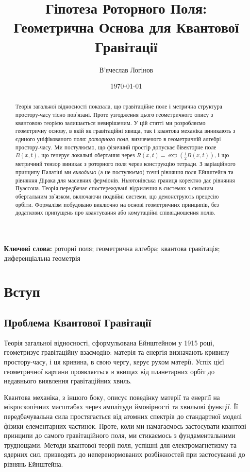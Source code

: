 \documentclass[11pt,a4paper]{article}
\title{Гіпотеза Роторного Поля: Геометрична Основа для Квантової Гравітації}
\author[1]{В'ячеслав Логінов}
\affil[1]{Київ, Україна\\ \texttt{barthez.slavik@gmail.com}}
\date{\today} %
\numberwithin{equation}{section}
\theoremstyle{plain}
\theoremstyle{definition}
\theoremstyle{remark}
\newcommand{\keywords}{\textbf{Ключові слова:} роторні поля; геометрична алгебра; квантова гравітація; диференціальна геометрія}
\begin{document}
\maketitle

\begin{abstract}
Теорія загальної відносності показала, що гравітаційне поле і метрична структура простору-часу тісно пов'язані. Проте узгодження цього геометричного опису з квантовою теорією залишається невирішеним. У цій статті ми розробляємо геометричну основу, в якій як гравітаційні явища, так і квантова механіка виникають з єдиного уніфікованого поля: \emph{роторного поля}, визначеного в геометричній алгебрі простору-часу. Ми постулюємо, що фізичний простір допускає бівекторне поле $B(x,t)$, що генерує локальні обертання через $R(x,t)=\exp(\frac{1}{2}B(x,t))$, і що метричний тензор виникає з роторного поля через конструкцію тетради. З варіаційного принципу Палатіні ми \emph{виводимо} (а не постулюємо) точні рівняння поля Ейнштейна та рівняння Дірака для масивних ферміонів. Ньютонівська границя коректно дає рівняння Пуассона. Теорія передбачає спостережувані відхилення в системах з сильним обертальним зв'язком, включаючи подвійні системи, що демонструють прецесію орбіти. Формалізм побудовано виключно на основі геометричних принципів, без додаткових припущень про квантування або комутаційні співвідношення полів.
\end{abstract}

\keywords

\section{Вступ}
\label{sec:intro}

\subsection{Проблема Квантової Гравітації}

Теорія загальної відносності, сформульована Ейнштейном у 1915 році, геометризує гравітаційну взаємодію: матерія та енергія визначають кривину простору-часу, і ця кривина, в свою чергу, керує рухом матерії. Успіх цієї геометричної картини проявляється в явищах від планетарних орбіт до недавнього виявлення гравітаційних хвиль.

Квантова механіка, з іншого боку, описує поведінку матерії та енергії на мікроскопічних масштабах через амплітуди ймовірності та хвильові функції. Її передбачувальна сила простягається від атомних спектрів до стандартної моделі фізики елементарних частинок. Проте, коли ми намагаємось застосувати квантові принципи до самого гравітаційного поля, ми стикаємось з фундаментальними труднощами. Методи квантової теорії поля, успішні для електромагнетизму та ядерних сил, призводять до неперенормованих розбіжностей при застосуванні до рівнянь Ейнштейна.
\end{document}
